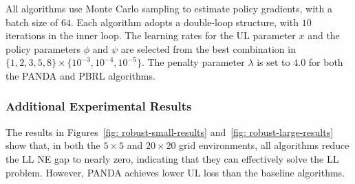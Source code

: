 \documentclass{article}
\theoremstyle{plain}
\theoremstyle{definition}
\theoremstyle{remark}
\begin{document}
All algorithms use Monte Carlo sampling to estimate policy gradients, with a batch size of $64$. Each algorithm adopts a double-loop structure, with $10$ iterations in the inner loop. The learning rates for the UL parameter $x$ and the policy parameters $\phi$ and $\psi$ are selected from the best combination in $\{1,2,3,5,8\} \times \{10^{-3},10^{-4},10^{-5}\}$. The penalty parameter $\lambda$ is set to $4.0$ for both the PANDA and PBRL algorithms.

\subsubsection{Additional Experimental Results}
The results in Figures~\ref{fig: robust-small-results}
and~\ref{fig: robust-large-results} show that, in both the $5 \times 5$ and
$20 \times 20$ grid environments, all algorithms reduce the LL NE gap to
nearly zero, indicating that they can effectively solve the LL problem.
However, PANDA achieves lower UL loss than the baseline algorithms.
\end{document}
